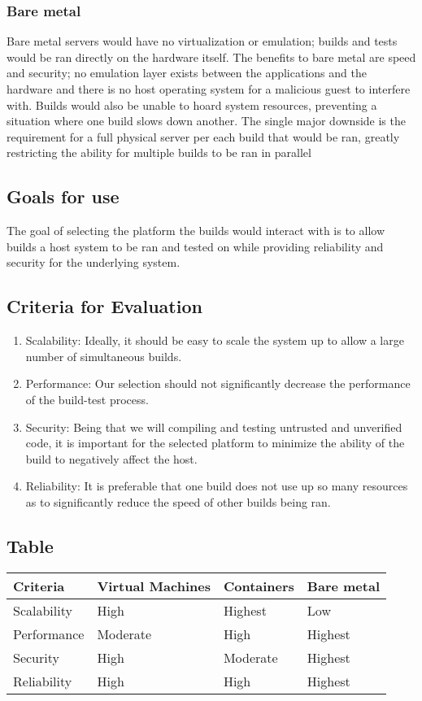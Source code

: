 \documentclass[10pt,letterpaper,onecolumn,journal]{IEEEtran}
\begin{document}
\subsubsection{Bare metal}
Bare metal servers would have no virtualization or emulation; builds and tests would be ran directly on the hardware itself. The benefits to bare metal are speed and security; no emulation layer exists between the applications and the hardware and there is no host operating system for a malicious guest to interfere with. Builds would also be unable to hoard system resources, preventing a situation where one build slows down another. The single major downside is the requirement for a full physical server per each build that would be ran, greatly restricting the ability for multiple builds to be ran in parallel
\subsection{Goals for use}
The goal of selecting the platform the builds would interact with is to allow builds a host system to be ran and tested on while providing reliability and security for the underlying system.
\subsection{Criteria for Evaluation}
\begin{enumerate}
  \item Scalability: Ideally, it should be easy to scale the system up to allow a large number of simultaneous builds.
  \item Performance: Our selection should not significantly decrease the performance of the build-test process.
  \item Security: Being that we will compiling and testing untrusted and unverified code, it is important for the selected platform to minimize the ability of the build to negatively affect the host.
  \item Reliability: It is preferable that one build does not use up so many resources as to significantly reduce the speed of other builds being ran.
\end{enumerate}
\subsection{Table}
\begin{center}
  \begin{tabular}{llll}
    Criteria & Virtual Machines & Containers & Bare metal \\ \midrule
    Scalability       & High & Highest & Low \\ \midrule
    Performance           & Moderate & High & Highest \\ \midrule
    Security       & High & Moderate & Highest \\ \midrule
    Reliability  & High & High & Highest \\ \bottomrule
  \end{tabular}
\end{center}
\end{document}

